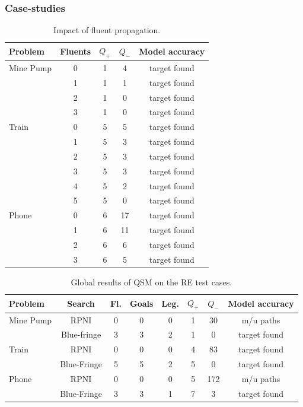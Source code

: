 \subsubsection*{Case-studies}

\begin{table}[H]
\small
\centering
\begin{tabular}{|l||c||c|c|c|}\hline
Problem&Fluents&$Q_+$&$Q_-$&Model accuracy\\\hline\hline
Mine Pump&0&1&4&target found\\\cline{2-5}
&1&1&1&target found\\\cline{2-5}
&2&1&0&target found\\\cline{2-5}
&3&1&0&target found\\\hline\hline
Train&0&5&5&target found\\\cline{2-5}
&1&5&3&target found\\\cline{2-5}
&2&5&3&target found\\\cline{2-5}
&3&5&3&target found\\\cline{2-5}
&4&5&2&target found\\\cline{2-5}
&5&5&0&target found\\\hline\hline
Phone&0&6&17&target found\\\cline{2-5}
&1&6&11&target found\\\cline{2-5}
&2&6&6&target found\\\cline{2-5}
&3&6&5&target found\\\hline
\end{tabular}
\caption{Impact of fluent propagation.\label{Fluents:res}}
\end{table}

\begin{table}[H]
\begin{small}
\centering
\begin{tabular}{|l||c|c|c|c||c|c|c|}\hline
Problem&Search&Fl.&Goals&Leg.&$Q_+$&$Q_-$&Model accuracy\\\hline\hline
Mine Pump&RPNI&0&0&0&1&30&m/u paths\\\cline{2-8}
&Blue-fringe&3&3&2&1&0&target found\\\hline\hline
Train&RPNI&0&0&0&4&83&target found\\\cline{2-8}
&Blue-Fringe&5&5&2&5&0&target found\\\hline\hline
Phone&RPNI&0&0&0&5&172&m/u paths\\\cline{2-8}
&Blue-Fringe&3&3&1&7&3&target found\\\hline
\end{tabular}
\end{small}
\caption{Global results of QSM on the RE test cases\label{All:res}.}
\end{table}

